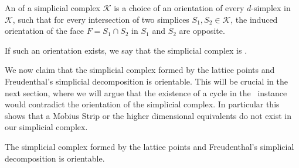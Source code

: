 \begin{definition}
    An  of a simplicial complex $\mathcal{K}$ is a choice of an orientation of every $d$-simplex in $\mathcal{K}$, such that for every intersection of two simplices $S_1, S_2 \in \mathcal{K}$, the induced orientation of the face $F = S_1 \cap S_2$ in $S_1$ and $S_2$ are opposite. \par
    If such an orientation exists, we say that the simplicial complex is .
\end{definition}

We now claim that the simplicial complex formed by the lattice points and Freudenthal's simplicial decomposition is orientable. This will be crucial in the next section, where we will argue that the existence of a cycle in the \EndOfLine\ instance would contradict the orientation of the simplicial complex. In particular this shows that a Mobius Strip or the higher dimensional equivalents do not exist in our simplicial complex.

\begin{claim}
    The simplicial complex formed by the lattice points and Freudenthal's simplicial decomposition is orientable.
\end{claim}

